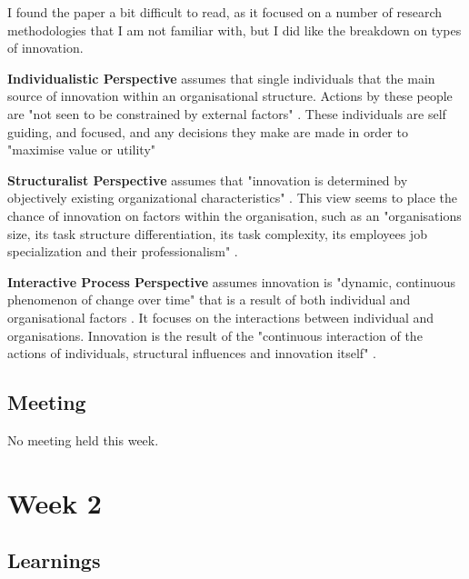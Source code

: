 I found the paper a bit difficult to read, as it focused on a number of research methodologies that I am not familiar with, but I did like the breakdown on types of innovation.

\textbf{Individualistic Perspective} assumes that single individuals  that the main source of innovation within an organisational structure. Actions by these people are "not seen to be constrained by external factors" \parencite{week1}. These individuals are self guiding, and focused, and any decisions they make are made in order to "maximise value or utility" \parencite{week1}

\textbf{Structuralist Perspective} assumes that "innovation is determined by objectively existing organizational characteristics" \parencite{week1}. This view seems to place the chance of innovation on factors within the organisation, such as an "organisations size, its task structure differentiation, its task complexity, its employees job specialization and their professionalism" \parencite{week1}.	 

\textbf{Interactive Process Perspective} assumes innovation is "dynamic, continuous phenomenon of change over time" that is a result of both individual and organisational factors \parencite{week1}. It focuses on the interactions between individual and organisations. Innovation is the result of the "continuous interaction of the actions of individuals, structural influences and innovation itself" \parencite{week1}.

\section{Meeting}

No meeting held this week.

\chapter{Week 2}

\section{Learnings}

